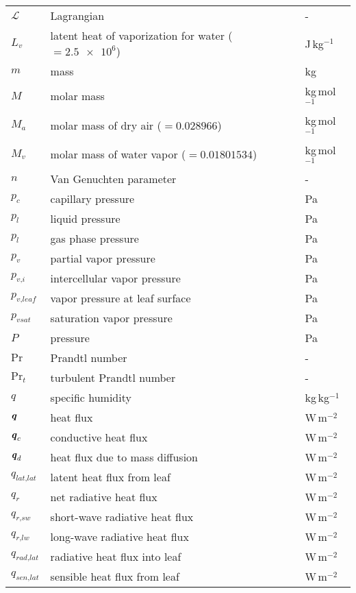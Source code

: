 \begin{longtable}{p{}p{}p{}}
	$\mathcal{L}$ & Lagrangian & - \\ 
	$L_v$ & latent heat of vaporization for water ($=\num{2.5e6}$) & J\,kg$^{-1}$ \\ 
	$m$ & mass & kg \\ 
	$M$ & molar mass & kg\,mol$^{-1}$ \\ 
	$M_a$ & molar mass of dry air ($=\num{0.028966}$) & kg\,mol$^{-1}$ \\ 	
	$M_v$ & molar mass of water vapor ($=\num{0.01801534}$) & kg\,mol$^{-1}$ \\ 		
	$n$ & Van Genuchten parameter & - \\
	$p_c$ & capillary pressure & Pa \\ 
	$p_l$ & liquid pressure & Pa \\ 	
	$p_l$ & gas phase pressure & Pa \\ 		
	$p_v$ & partial vapor pressure & Pa \\ 	
	$p_{\textit{v,i}}$ & intercellular vapor pressure & Pa \\ 			
	$p_{\textit{v,leaf}}$ & vapor pressure at leaf surface & Pa \\ 			
	$p_{\textit{vsat}}$ & saturation vapor pressure & Pa \\ 		
	$P$ & pressure & Pa \\ 
	$\mathrm{Pr}$ & Prandtl number & - \\ 	
	$\mathrm{Pr}_t$ & turbulent Prandtl number & - \\ 		


	$q$ & specific humidity & kg\,kg$^{-1}$\\ 	
	$\textbf{\textit{q}}$ & heat flux & W\,m$^{-2}$\\ 	
	$\textbf{\textit{q}}_c$ & conductive heat flux & W\,m$^{-2}$\\ 		
	$\textbf{\textit{q}}_d$ & heat flux due to mass diffusion & W\,m$^{-2}$\\ 			
	$q_{\textit{lat,lat}}$ & latent heat flux from leaf & W\,m$^{-2}$\\ 	
	$q_{\textit{r}}$ & net radiative heat flux & W\,m$^{-2}$\\ 	
	$q_{\textit{r,sw}}$ & short-wave radiative heat flux & W\,m$^{-2}$\\ 	
	$q_{\textit{r,lw}}$ & long-wave radiative heat flux & W\,m$^{-2}$\\ 		
	$q_{\textit{rad,lat}}$ & radiative heat flux into leaf & W\,m$^{-2}$\\ 		
	$q_{\textit{sen,lat}}$ & sensible heat flux from leaf & W\,m$^{-2}$\\ 
	

\end{longtable}
